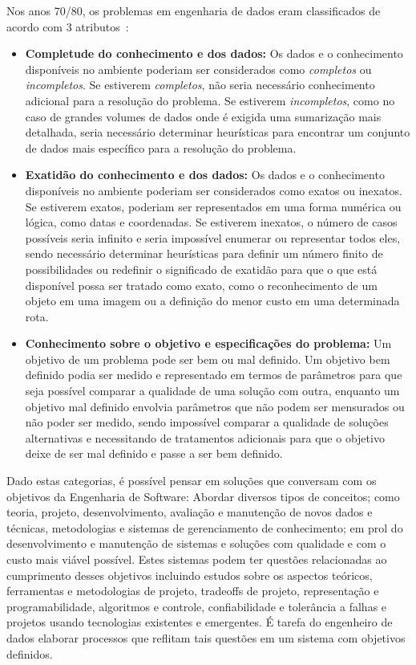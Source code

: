\documentclass[portugues]{ic-tese}
\begin{document}
Nos anos 70/80, os problemas em engenharia de dados eram classificados de acordo com 3 atributos~\citep{IEEE_1989}:

\begin{itemize}
\item \textbf{Completude do conhecimento e dos dados:} Os dados e o conhecimento disponíveis no ambiente poderiam ser considerados como \textit{completos} ou \textit{incompletos}. Se estiverem \textit{completos}, não seria necessário conhecimento adicional para a resolução do problema. Se estiverem \textit{incompletos}, como no caso de grandes volumes de dados onde é exigida uma sumarização mais detalhada, seria necessário determinar heurísticas para encontrar um conjunto de dados mais específico para a resolução do problema.
\item \textbf{Exatidão do conhecimento e dos dados:} Os dados e o conhecimento disponíveis no ambiente poderiam ser considerados como exatos ou inexatos. Se estiverem exatos, poderiam ser representados em uma forma numérica ou lógica, como datas e coordenadas. Se estiverem inexatos, o número de casos possíveis seria infinito e seria impossível enumerar ou representar todos eles, sendo necessário determinar heurísticas para definir um número finito de possibilidades ou redefinir o significado de exatidão para que o que está disponível possa ser tratado como exato, como o reconhecimento de um objeto em uma imagem ou a definição do menor custo em uma determinada rota.
\item \textbf{Conhecimento sobre o objetivo e especificações do problema:} Um objetivo de um problema pode ser bem ou mal definido. Um objetivo bem definido podia ser medido e representado em termos de parâmetros para que seja possível comparar a qualidade de uma solução com outra, enquanto um objetivo mal definido envolvia parâmetros que não podem ser mensurados ou não poder ser medido, sendo impossível comparar a qualidade de soluções alternativas e necessitando de tratamentos adicionais para que o objetivo deixe de ser mal definido e passe a ser bem definido. 
\end{itemize}

Dado estas categorias, é possível pensar em soluções que conversam com os objetivos da Engenharia de Software: Abordar diversos tipos de conceitos; como teoria, projeto, desenvolvimento, avaliação e manutenção de novos dados e técnicas, metodologias e sistemas de gerenciamento de conhecimento; em prol do desenvolvimento e manutenção de sistemas e soluções com qualidade e com o custo mais viável possível. Estes sistemas podem ter questões relacionadas ao cumprimento desses objetivos incluindo estudos sobre os aspectos teóricos, ferramentas e metodologias de projeto, tradeoffs de projeto, representação e programabilidade, algoritmos e controle, confiabilidade e tolerância a falhas e projetos usando tecnologias existentes e emergentes. É tarefa do engenheiro de dados elaborar processos que reflitam tais questões em um sistema com objetivos definidos.
\end{document}
